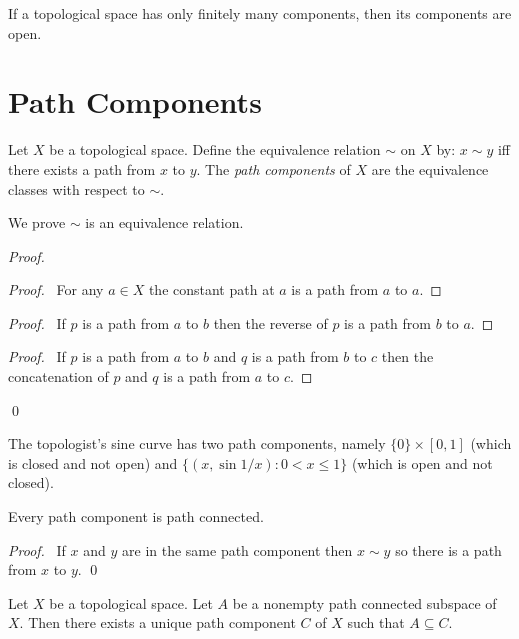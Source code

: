 \begin{cor}
If a topological space has only finitely many components, then its components are open.
\end{cor}

\section{Path Components}

\begin{df}
Let $X$ be a topological space. Define the equivalence relation $\sim$ on $X$ by: $x \sim y$ iff there exists a path from $x$ to $y$. The \emph{path components} of $X$ are the equivalence classes with respect to $\sim$.

We prove $\sim$ is an equivalence relation.
\end{df}

\begin{proof}
\pf
{}
\begin{proof}
	\pf\ For any $a \in X$ the constant path at $a$ is a path from $a$ to $a$.
\end{proof}
\begin{proof}
	\pf\ If $p$ is a path from $a$ to $b$ then the reverse of $p$ is a path from $b$ to $a$.
\end{proof}
\begin{proof}
	\pf\ If $p$ is a path from $a$ to $b$ and $q$ is a path from $b$ to $c$ then the concatenation of $p$ and $q$ is a path from $a$ to $c$.
\end{proof}
\qed
\end{proof}

\begin{ex}
The topologist's sine curve has two path components, namely $\{0\} \times [0,1]$ (which is closed and not open) and $\{ (x, \sin 1/x) : 0 < x \leq 1 \}$ (which is open and not closed).
\end{ex}

\begin{prop}
Every path component is path connected.
\end{prop}

\begin{proof}
\pf\ If $x$ and $y$ are in the same path component then $x \sim y$ so there is a path from $x$ to $y$. \qed
\end{proof}

\begin{prop}
Let $X$ be a topological space. Let $A$ be a nonempty path connected subspace of $X$. Then there exists a unique path component $C$ of $X$ such that $A \subseteq C$.
\end{prop}

